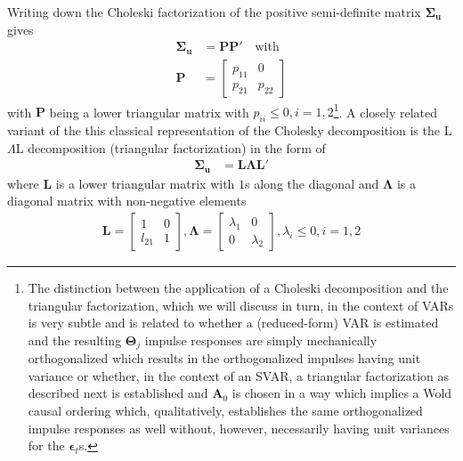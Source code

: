 \documentclass[a4paper,11pt,listof=nochaptergap,oneside,pointednumbers,bibtotoc,bigheadings,liststotoc]{scrbook}
\theoremstyle{mysatz}
\theoremstyle{mydefinition}
\theoremstyle{mytheorem}
\theoremstyle{mybemerkung}
\newcommand{\vect}[1]{\boldsymbol{\mathbf{#1}}}
\begin{document}
Writing down the Choleski factorization of the positive semi-definite matrix $\vect{\Sigma_u}$ gives
\begin{equation} \label{eq:svar14}
\begin{split}
 		\vect{\Sigma_u} & = \vect{P}\vect{P'} \quad \text{with} \\
		\vect{P} & = \begin{bmatrix}
    							p_{11} & 0 \\
							p_{21} & p_{22}
 							\end{bmatrix}
\end{split}								
\end{equation}
with $\vect{P}$ being a lower triangular matrix with $p_{ii} \leq 0, i = 1, 2$\footnote{The distinction between the application of a Choleski decomposition and the triangular factorization, which we will discuss in turn, in the context of VARs is very subtle and is related to whether a (reduced-form) VAR is estimated and the resulting $\vect{\Theta}_j$ impulse responses are simply mechanically orthogonalized which results in the orthogonalized impulses having unit variance or whether, in the context of an SVAR, a triangular factorization as described next is established and $\vect{A}_0$ is chosen in a way which implies a Wold causal ordering which, qualitatively, establishes the same orthogonalized impulse responses as well without, however, necessarily having unit variances for the $\vect{\epsilon}_t$s.}. A closely related variant of the this classical representation of the Cholesky decomposition is the L$\Lambda$L decomposition (triangular factorization) in the form of 
\begin{equation} \label{eq:svar15}
\begin{split}
 		\vect{\Sigma_u} & = \vect{L}\vect{\Lambda}\vect{L'}
\end{split}								
\end{equation}
where $\vect{L}$ is a lower triangular matrix with $1$s along the diagonal and $\vect{\Lambda}$ is a diagonal matrix with non-negative elements
\begin{equation} \label{eq:svar16}
\begin{split}
	\vect{L} =  \begin{bmatrix}
    				1 & 0 \\
				l_{21} & 1 
 				\end{bmatrix}, 
				\vect{\Lambda} = 
					\begin{bmatrix}
    					\lambda_1 & 0 \\
					0 & \lambda_2 
 					\end{bmatrix},
					\lambda_i \leq 0, i = 1, 2
\end{split}								
\end{equation}
\end{document}
